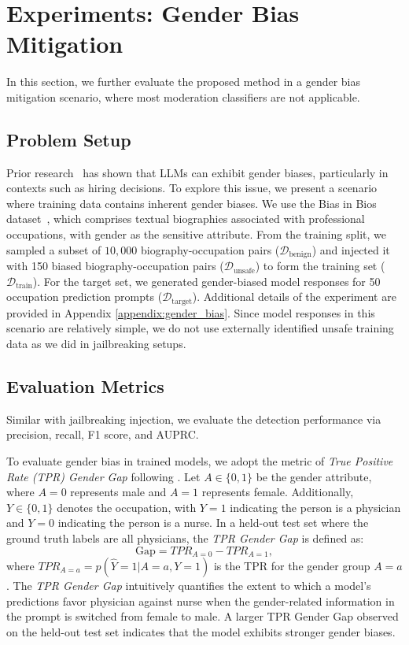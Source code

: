 \documentclass[11pt]{article}
\begin{document}
\section{Experiments: Gender Bias Mitigation} \label{sec:gender_bias}


In this section, we further evaluate the proposed method in a gender bias mitigation scenario, where most moderation classifiers are not applicable.

\subsection{Problem Setup}
Prior research~\citep{an-etal-2024-large} has shown that LLMs can exhibit gender biases, particularly in contexts such as hiring decisions. To explore this issue, we present a scenario where training data contains inherent gender biases. We use the Bias in Bios dataset~\citep{10.1145/3287560.3287572}, which comprises textual biographies associated with professional occupations, with gender as the sensitive attribute. From the training split, we sampled a subset of $10,000$ biography-occupation pairs ($\mathcal{D}_{\text{benign}}$) and injected it with 150 biased biography-occupation pairs ($\mathcal{D}_{\text{unsafe}}$) to form the training set ($\mathcal{D}_{\text{train}}$). For the target set, we generated gender-biased model responses for 50 occupation prediction prompts ($\mathcal{D}_{\text{target}}$). Additional details of the experiment are provided in Appendix \ref{appendix:gender_bias}. 
Since model responses in this scenario are relatively simple,
we do not use externally identified unsafe training data as we did in jailbreaking setups.

\subsection{Evaluation Metrics}

Similar with jailbreaking injection, we evaluate the detection performance via precision, recall, F1 score, and AUPRC.

To evaluate gender bias in trained models, we adopt the metric of \textit{True Positive Rate (TPR) Gender Gap} following \citet{De_Arteaga_2019}. Let $A \in \{0, 1\}$ be the gender attribute, where $A = 0$ represents male and $A = 1$ represents female. Additionally, $Y \in \{0, 1\}$ denotes the occupation, with $Y = 1$ indicating the person is a physician and $Y = 0$ indicating the person is a nurse. In a held-out test set where the ground truth labels are all physicians, the \textit{TPR Gender Gap} is defined as:
$$\text{Gap} = TPR_{A=0} - TPR_{A=1},$$
where $TPR_{A=a} = p(\hat{Y}=1|A = a, Y = 1)$ is the TPR for the gender group $A=a$.
The \textit{TPR Gender Gap} intuitively quantifies the extent to which a model's predictions favor physician against nurse when the gender-related information in the prompt is switched from female to male. A larger TPR Gender Gap observed on the held-out test set indicates that the model exhibits stronger gender biases. 
\end{document}
